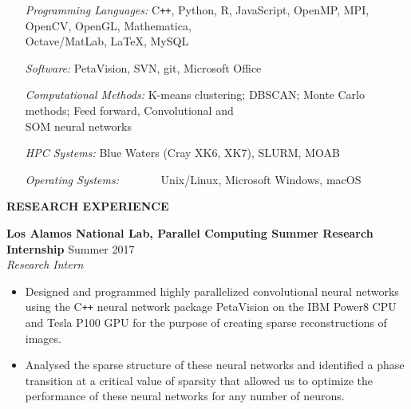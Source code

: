 \documentclass[10pt]{letter}
\begin{document}
\begin{itemize}[leftmargin=4.15cm] 

\item[{\sl Programming Languages: \hspace{-.25cm}} ]  C\texttt{++}, Python, R, JavaScript,  OpenMP, MPI, OpenCV, OpenGL, Mathematica, \\ Octave/MatLab, \LaTeX, MySQL

\item[{\sl Software: \hspace{64pt} }] PetaVision, SVN, git, Microsoft Office


\item[{\sl Computational Methods:} ] K-means clustering; DBSCAN; Monte Carlo methods; Feed forward, Convolutional and\\ SOM neural networks

\item[{\sl HPC Systems: \hspace{1.5cm}} ] Blue Waters (Cray XK6, XK7), SLURM, MOAB

\item[{\sl Operating Systems: \ \ \ \ \ \ } ] Unix/Linux, Microsoft Windows, macOS 
\end{itemize}

\vspace{.5cm}
 


{\bf RESEARCH EXPERIENCE}


 {\bf Los Alamos National Lab, Parallel Computing Summer Research Internship} \hfill Summer 2017\\
{\sl Research Intern}
\vspace{-.25cm}

\begin{itemize}
\item Designed and programmed highly parallelized convolutional neural networks using the C\texttt{++} neural network package PetaVision on the IBM Power8 CPU and Tesla P100 GPU for the purpose of creating sparse reconstructions of images.

\item Analysed the sparse structure of these neural networks and identified a phase transition at a critical value of sparsity that allowed us to optimize the performance of these neural networks for any number of neurons.
\end{itemize}
\end{document}
